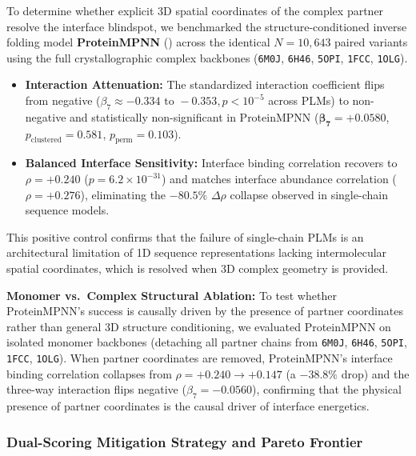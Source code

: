 \documentclass[
  11pt,
  us-letterpaper,
  DIV=11,
  numbers=noendperiod]{scrartcl}
\providecommand{\tightlist}{%
  \setlength{\itemsep}{0pt}\setlength{\parskip}{0pt}}
\begin{document}
To determine whether explicit 3D spatial coordinates of the complex
partner resolve the interface blindspot, we benchmarked the
structure-conditioned inverse folding model \textbf{ProteinMPNN}
() across the
identical \(N = 10,643\) paired variants using the full crystallographic
complex backbones (\texttt{6M0J}, \texttt{6H46}, \texttt{5OPI},
\texttt{1FCC}, \texttt{1OLG}).

\begin{itemize}
\tightlist
\item
  \textbf{Interaction Attenuation:} The standardized interaction
  coefficient flips from negative
  (\(\beta_7 \approx -0.334\text{ to }-0.353, p < 10^{-5}\) across PLMs)
  to non-negative and statistically non-significant in ProteinMPNN
  (\(\mathbf{\beta_7 = +0.0580}\), \(p_{\text{clustered}} = 0.581\),
  \(p_{\text{perm}} = 0.103\)).
\item
  \textbf{Balanced Interface Sensitivity:} Interface binding correlation
  recovers to \(\rho = \mathbf{+0.240}\) (\(p = 6.2 \times 10^{-31}\))
  and matches interface abundance correlation (\(\rho = +0.276\)),
  eliminating the \(-80.5\%\) \(\Delta\rho\) collapse observed in
  single-chain sequence models.
\end{itemize}

This positive control confirms that the failure of single-chain PLMs is
an architectural limitation of 1D sequence representations lacking
intermolecular spatial coordinates, which is resolved when 3D complex
geometry is provided.

\textbf{Monomer vs.~Complex Structural Ablation:} To test whether
ProteinMPNN's success is causally driven by the presence of partner
coordinates rather than general 3D structure conditioning, we evaluated
ProteinMPNN on isolated monomer backbones (detaching all partner chains
from \texttt{6M0J}, \texttt{6H46}, \texttt{5OPI}, \texttt{1FCC},
\texttt{1OLG}). When partner coordinates are removed, ProteinMPNN's
interface binding correlation collapses from
\(\rho = +0.240 \to +0.147\) (a \(-38.8\%\) drop) and the three-way
interaction flips negative (\(\beta_7 = -0.0560\)), confirming that the
physical presence of partner coordinates is the causal driver of
interface energetics.

\subsubsection{Dual-Scoring Mitigation Strategy and Pareto
Frontier}\label{dual-scoring-mitigation-strategy-and-pareto-frontier}
\end{document}
